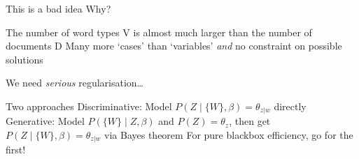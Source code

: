 \documentclass{mediumfoils}
\begin{document}
This is a bad idea
\ita
\itm Why?
\itz


The number of word types V is almost much larger than the number of documents D
\ita
\itm Many more `cases' than `variables'
\itm \textit{and} no constraint on possible solutions
\itz

We need \textit{serious} regularisation\ldots




Two approaches
\ita
\itm Discriminative: Model $P(Z \mid \{W\}, \beta) = \theta_{z|w}$ directly
\itm Generative: Model $P(\{W\} \mid Z, \beta)$ and $P(Z)=\theta_z$, then get $P(Z \mid \{W\}, \beta) = \theta_{z|w}$ via Bayes theorem
\itz
For pure blackbox efficiency, go for the first!
\end{document}
